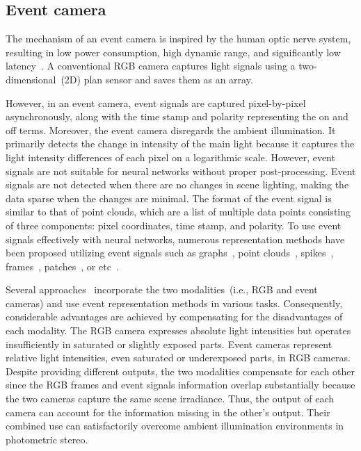 \documentclass[preprint,12pt,authoryear]{elsarticle}
\begin{document}
\subsection{Event camera}
The mechanism of an event camera is inspired by the human optic nerve system, resulting in low power consumption, high dynamic range, and significantly low latency~\citep{gallego2020event}. A conventional RGB camera captures light signals using a two-dimensional~(2D) plan sensor and saves them as an array.

However, in an event camera, event signals are captured pixel-by-pixel asynchronously, along with the time stamp and polarity representing the on and off terms.
Moreover, the event camera disregards the ambient illumination. It primarily detects the change in intensity of the main light because it captures the light intensity differences of each pixel on a logarithmic scale. However, event signals are not suitable for neural networks without proper post-processing. Event signals are not detected when there are no changes in scene lighting, making the data sparse when the changes are minimal.
The format of the event signal is similar to that of point clouds, which are a list of multiple data points consisting of three components: pixel coordinates, time stamp, and polarity.
To use event signals effectively with neural networks, numerous representation methods have been proposed utilizing event signals such as graphs~\citep{bi2019graph,bi2020graph}, point clouds~\citep{sekikawa2019eventnet,vemprala2021representation}, spikes~\citep{kim2021optimizing,lee2020spike}, frames~\citep{rebecq2017real,innocenti2021temporal,gehrig2019end,ryan2021real}, patches~\citep{sabater2022event}, or etc~\citep{dong2022event}. 

Several approaches~\citep{messikommer2022multi,gehrig2021combining,messikommer2022bridging} incorporate the two modalities~(i.e., RGB and event cameras) and use event representation methods in various tasks. Consequently, considerable advantages are achieved by compensating for the disadvantages of each modality. The RGB camera expresses absolute light intensities but operates insufficiently in saturated or slightly exposed parts. Event cameras represent relative light intensities, even saturated or underexposed parts, in RGB cameras. Despite providing different outputs, the two modalities compensate for each other since the RGB frames and event signals information overlap substantially because the two cameras capture the same scene irradiance. Thus, the output of each camera can account for the information missing in the other's output. Their combined use can satisfactorily overcome ambient illumination environments in photometric stereo.
\end{document}
